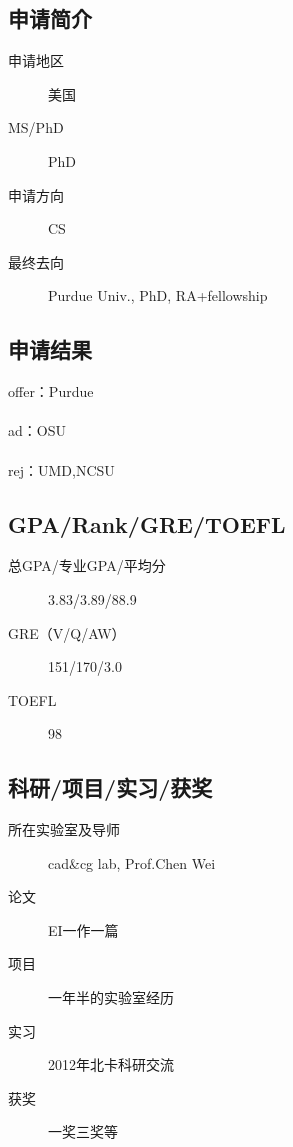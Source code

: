 \documentclass[11pt,fleqn,openany]{book} %
\begin{document}
\noindent\begin{minipage}[t]{0.45\textwidth}
\subsection*{申请简介}
\begin{description}
\item[申请地区] 美国
\item[MS/PhD] PhD
\item[申请方向] CS
\item[最终去向] Purdue Univ., PhD, RA+fellowship
\end{description}
\end{minipage}
\hfill
\begin{minipage}[t]{0.45\textwidth}
\subsection*{申请结果}
\noindent offer：Purdue\\
\\
ad：OSU\\
\\
rej：UMD,NCSU
\end{minipage}
\subsection*{GPA/Rank/GRE/TOEFL}
\begin{description}
\item[总GPA/专业GPA/平均分] 3.83/3.89/88.9
\item[GRE（V/Q/AW）] 151/170/3.0
\item[TOEFL] 98
\end{description}

\subsection*{科研/项目/实习/获奖}
\begin{description}
\item[所在实验室及导师] cad\&cg lab, Prof.Chen Wei
\item[论文] EI一作一篇
\item[项目] 一年半的实验室经历
\item[实习] 2012年北卡科研交流
\item[获奖] 一奖三奖等
\end{description}
\end{document}
